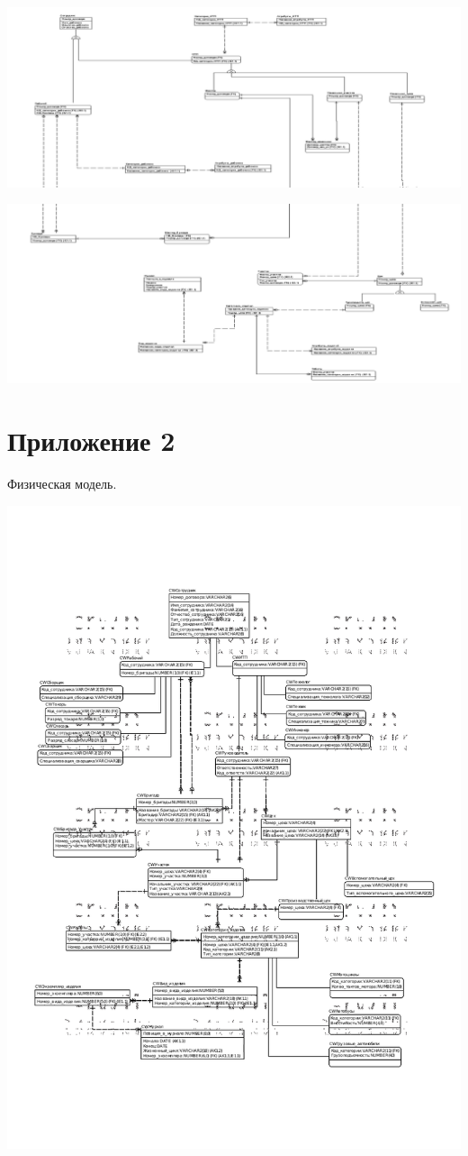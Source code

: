     \includegraphics[width=14cm]{./screenshots/model/logical1.png}

    \includegraphics[width=14cm]{./screenshots/model/logical2.png}

\section{Приложение 2}

    Физическая модель.

    \includegraphics[width=14cm]{./screenshots/model/physical.png}

